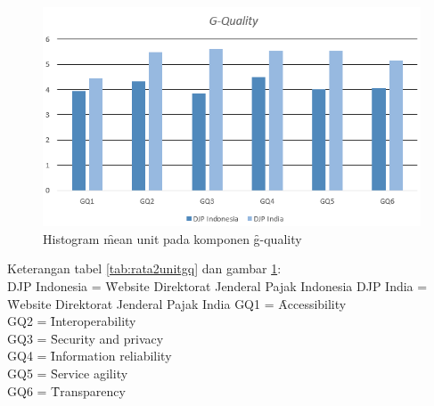 \begin{figure}
	\centering
	\includegraphics[width=\textwidth]
	{pics/historata2gq.PNG}
	\caption{Histogram \f{mean} unit pada komponen \f{g-quality}}
	\label{fig:historata2gq}
\end{figure}
\pagebreak

\noindent
Keterangan tabel \ref{tab:rata2unitgq} dan gambar \ref{fig:historata2gq}: \\
DJP Indonesia = \f{Website} Direktorat Jenderal Pajak Indonesia
DJP India = \f{Website} Direktorat Jenderal Pajak India
GQ1 = \f{Accessibility} \\
GQ2 = \f{Interoperability} \\
GQ3 = \f{Security and privacy} \\
GQ4 = \f{Information reliability} \\
GQ5 = \f{Service agility} \\
GQ6 = \f{Transparency} \\
